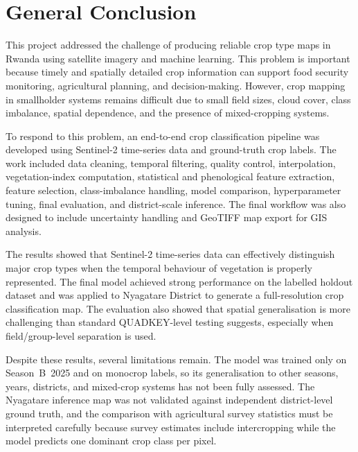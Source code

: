 \chapter*{General Conclusion}
\label{ch:con}

This project addressed the challenge of producing reliable crop type maps in
Rwanda using satellite imagery and machine learning. This problem is important
because timely and spatially detailed crop information can support food security
monitoring, agricultural planning, and decision-making. However, crop mapping in
smallholder systems remains difficult due to small field sizes, cloud cover,
class imbalance, spatial dependence, and the presence of mixed-cropping systems.

To respond to this problem, an end-to-end crop classification pipeline was
developed using Sentinel-2 time-series data and ground-truth crop labels. The
work included data cleaning, temporal filtering, quality control, interpolation,
vegetation-index computation, statistical and phenological feature extraction,
feature selection, class-imbalance handling, model comparison, hyperparameter
tuning, final evaluation, and district-scale inference. The final workflow was
also designed to include uncertainty handling and GeoTIFF map export for GIS
analysis.

The results showed that Sentinel-2 time-series data can effectively distinguish
major crop types when the temporal behaviour of vegetation is properly
represented. The final model achieved strong performance on the labelled
holdout dataset and was applied to Nyagatare District to generate a
full-resolution crop classification map. The evaluation also showed that
spatial generalisation is more challenging than standard QUADKEY-level testing
suggests, especially when field/group-level separation is used.

Despite these results, several limitations remain. The model was trained only
on Season~B~2025 and on monocrop labels, so its generalisation to other seasons,
years, districts, and mixed-crop systems has not been fully assessed. The
Nyagatare inference map was not validated against independent district-level
ground truth, and the comparison with agricultural survey statistics must be
interpreted carefully because survey estimates include intercropping while the
model predicts one dominant crop class per pixel.

